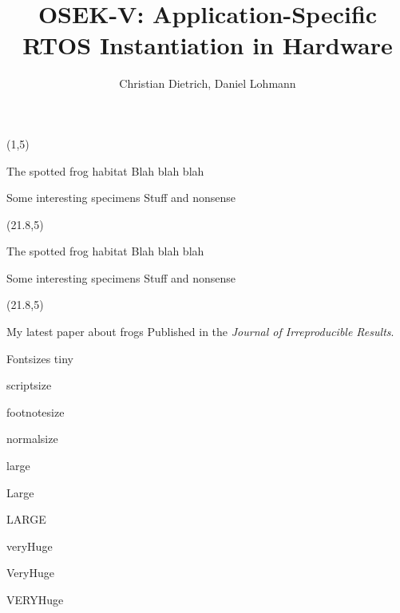 \documentclass[]{beamer}
\title{OSEK-V: Application-Specific RTOS Instantiation in Hardware}
\author{Christian Dietrich, Daniel Lohmann}
\begin{document}
\begin{frame}{}

\begin{textblock}{19.5}(1,5)
\begin{block}{The spotted frog habitat}
Blah blah blah
\end{block}

\begin{block}{Some interesting specimens}
Stuff and nonsense
\end{block}
\end{textblock}

\begin{textblock}{19.5}(21.8,5)
\begin{block}{The spotted frog habitat}
Blah blah blah
\end{block}

\begin{block}{Some interesting specimens}
Stuff and nonsense
\end{block}
\end{textblock}

\begin{textblock}{19.3}(21.8,5)
\begin{block}{My latest paper about frogs}
Published in the \emph{Journal of Irreproducible Results}.
\end{block}
\end{textblock}

\begin{block}{\large Fontsizes}
  \centering
  {\tiny tiny}\par
  {\scriptsize scriptsize}\par
  {\footnotesize footnotesize}\par
  {\normalsize normalsize}\par
  {\large large}\par
  {\Large Large}\par
  {\LARGE LARGE}\par
  {\veryHuge veryHuge}\par
  {\VeryHuge VeryHuge}\par
  {\VERYHuge VERYHuge}\par
\end{block}

\vfill
\end{frame}
\end{document}
